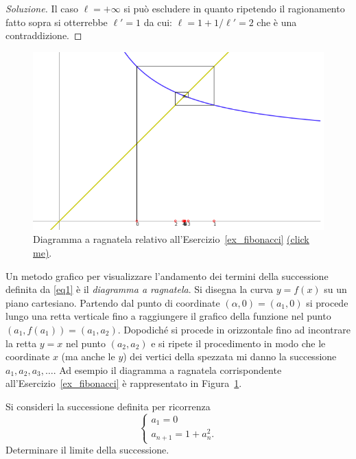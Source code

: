 \documentclass[italian,a4paper]{scrartcl}
\newcommand{\online}[1]{\href{http://paolini.github.io/recurrence/?#1}{\underline{(click
      me)}}}
\begin{document}
\begin{proof}[Soluzione]
    Il caso $\ell=+\infty$ si può escludere in quanto ripetendo il
    ragionamento fatto sopra si otterrebbe $\ell' = 1$ da cui:
    $\ell = 1 + 1/\ell' = 2$ che è una contraddizione.
\end{proof}

\begin{figure}
  \begin{center}
    \includegraphics[width=\textwidth]{fig_fibonacci.png}
  \end{center}
  \caption{Diagramma a ragnatela relativo
    all'Esercizio~\ref{ex_fibonacci} \online{expr=1\%2B1\%2Fx&x=1&scale=170&xoff=1.5&yoff=0.8}.}
  \label{fig_fibonacci}
\end{figure}

Un metodo grafico per visualizzare l'andamento dei termini della
successione definita da \eqref{eq1} è il \emph{diagramma a
  ragnatela}. Si disegna la curva $y=f(x)$ su un piano
cartesiano. Partendo dal punto di coordinate $(\alpha, 0)=(a_1, 0)$ si procede
lungo una retta verticale fino a raggiungere il grafico della funzione
nel punto $(a_1, f(a_1)) = (a_1, a_2)$. Dopodiché si procede in
orizzontale fino ad incontrare la retta $y=x$ nel punto $(a_2,a_2)$ e
si ripete il procedimento in modo che le coordinate $x$ (ma anche le $y$)
dei vertici della spezzata mi danno la successione $a_1, a_2, a_3,
\dots$. Ad esempio il diagramma a ragnatela corrispondente
all'Esercizio~\ref{ex_fibonacci} è rappresentato in
Figura~\ref{fig_fibonacci}.

\begin{exercise}\label{ex_3}
  Si consideri la successione definita per ricorrenza
  \[
  \begin{cases}
    a_1 = 0\\
    a_{n+1} =1 + a_n^2.
  \end{cases}
  \]
  Determinare il limite della successione.
\end{exercise}
\end{document}
